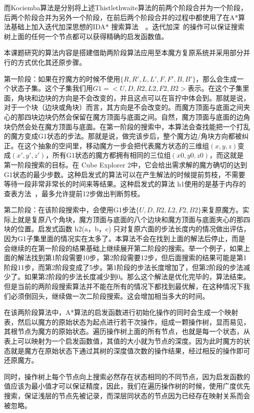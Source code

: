 而Kociemba算法是分别将上述Thistlethwaite算法的前两个阶段合并为一个阶段，后两个阶段合并为另外一个阶段，在前后两个阶段合并的过程中都使用了在A*算法基础上加入迭代加深思想的IDA* 搜索算法~\cite{35}~\cite{36}。迭代加深~\cite{37}的操作可以保证搜索树上面的任何一个节点都可以获得精确的启发函数值。

本课题研究的算法内容是搭建借助两阶段算法应用至本魔方复原系统并采用部分并行的方式优化其还原步骤。

第一阶段：如果在拧魔方的时候不使用$\{R,R',L,L',F,F',B,B'\}$，那么会生成一个状态子集。这个子集我们用$G1=<U,D,R2,L2,F2,B2>$表示。在这个子集里面，角块和边块的方向是不会改变的，并且这点可以在盲拧中体会到。那就是说，对于一个块（边块或角块）而言，其方向是不会改变的。而魔方顶面与底面之间夹心的那四块边块仍然会保留在魔方顶面与底面之间。自然，魔方顶面与底面的边角块仍然会处在魔方顶面与底面。在第一阶段的搜索中，本算法会查找能把一个打乱的魔方变成G1状态的步法。那就是说，做完该步后，整个魔方边/角块方向都被纠正。在这个抽象的空间里，移动魔方一步会把代表魔方状态的三维组$(x,y,z)$变成$(x',y',z')$，所有G1状态的魔方都拥有相同的三位组$(x0,y0,z0)$，而这就是第一阶段搜索的目标。在 Cube Explorer 2中，它会给出需求解的魔方确切的达到G1状态的最少步数。这种启发式的算法可以在产生解法的时候提前剪枝，不需要等待一段非常非常长的时间来等结果。这种启发式的算法 h1使用的是基于内存的查表方法~\cite{38}，最多允许提前12步做出判断剪枝。

第二阶段：在该阶段搜索中，会使用G1步法$\{U,D,R2,L2,F2,B2\}$来复原魔方。实际上就是复原八个角块，魔方顶面与底面的八个边块和魔方顶面与底面夹心的那四块的位置。启发式函数 h2(a，b，c) 只对复原六面的步法长度内的情况做出评估，因为G1子集里面的情况实在太多了。本算法不会在找到上面的解法后停止，而是会继续的在第一阶段的结果基础上继续展开第二阶段的搜索。举一个例子，如果上面的解法找到第1阶段需要10步，第2阶段需要12步，但后面搜索的结果可能是第1阶段11步，而第2阶段变成了5步。第1阶段的步法长度增加了，但第2阶段的步法减少了。如果第2阶段的步法长度减少到0。那么这个解法是优化完毕的，算法结束。 但是当前的两阶段搜索算法并不能在所有的情况下都找到最优解，在这种情况下我们必须倒回头，继续做一次二阶段搜索。这会增加相当多大的时间。

在该两阶段算法中，A*算法的启发函数进行初始化操作的同时会生成一个映射表，然后以魔方的原始状态为起点进行若干次操作，组成一颗操作树，显而易见，其根节点为魔方的原始状态。遍历操作树上面的所有节点，也就是每一个状态，从表上可以映射为一个启发函数值，其值的大小就为节点的深度。因为此时魔方的状态就是魔方在原始状态下通过其树的深度值次数的操作结果，经过相反的操作即可还原魔方。

同时，操作树上每个节点向上搜索必然存在状态相同的不同节点，因为启发函数的值应该为最小值才可以保证精度，因此，我们在遍历操作树的时候，使用广度优先搜索，保证浅层的节点先被记录，而深层同状态的节点因为已经存在映射关系而会被忽略。

